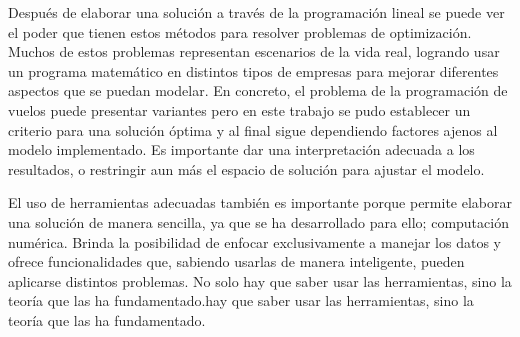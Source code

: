\documentclass[12pt]{article}
\begin{document}
Después de elaborar una solución a través de la programación lineal se puede ver el poder que tienen estos métodos para resolver problemas de optimización. Muchos de estos problemas representan escenarios de la vida real, logrando usar un programa matemático en distintos tipos de empresas para mejorar diferentes aspectos que se puedan modelar. En concreto, el problema de la programación de vuelos puede presentar variantes pero en este trabajo se pudo establecer un criterio para una solución óptima y al final sigue dependiendo factores ajenos al modelo implementado. Es importante dar una interpretación adecuada a los resultados, o restringir aun más el espacio de solución para ajustar el modelo.

El uso de herramientas adecuadas también es importante porque permite elaborar una solución de manera sencilla, ya que se ha desarrollado para ello; computación numérica. Brinda la posibilidad de enfocar exclusivamente a manejar los datos y ofrece funcionalidades que, sabiendo usarlas de manera inteligente, pueden aplicarse distintos problemas. No solo hay que saber usar las herramientas, sino la teoría que las ha fundamentado.hay que saber usar las herramientas, sino la teoría que las ha fundamentado.
\end{document}
